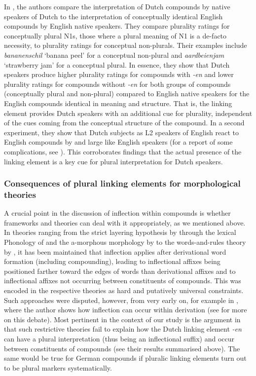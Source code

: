 In \textcite{BangaEa2013b}, the authors compare the interpretation of Dutch compounds by native speakers of Dutch to the interpretation of conceptually identical English compounds by English native speakers.
They compare plurality ratings for conceptually plural N1s, \ie those where a plural meaning of N1 is a de-facto necessity, to plurality ratings for conceptual non-plurals.
Their examples include \textit{bananenschil} `banana peel' for a conceptual non-plural and \textit{aardbeienjam} `strawberry jam' for a conceptual plural.
In essence, they show that Dutch speakers produce higher plurality ratings for compounds with \textit{-en} and lower plurality ratings for compounds without \textit{-en} for both groups of compounds (conceptually plural and non-plural) compared to English native speakers for the English compounds identical in meaning and structure.
That is, the linking element provides Dutch speakers with an additional cue for plurality, independent of the cues coming from the conceptual structure of the compound.
In a second experiment, they show that Dutch subjects as L2 speakers of English react to English compounds by and large like English speakers (for a report of some complications, see \citealt[211]{BangaEa2013b}).
This corroborates findings that the actual presence of the linking element is a key cue for plural interpretation for Dutch speakers.


\subsubsection{Consequences of plural linking elements for morphological theories}
\label{sec:consequencesofplurallinkagesformorphologicaltheories}

A crucial point in the discussion of inflection within compounds is whether frameworks and theories can deal with it appropriately, as we mentioned above.
In theories ranging from the strict layering hypothesis by \textcite{Siegel1979} through the lexical Phonology of \textcite{Mohanan1986} and the a-morphous morphology by \textcite{Anderson1992} to the words-and-rules theory by \textcite{Pinker1999}, it has been maintained that inflection applies after derivational word formation (including compounding), leading to inflectional affixes being positioned farther toward the edges of words than derivational affixes and to inflectional affixes not occurring between constituents of compounds.
This was encoded in the respective theories as hard and putatively universal constraints.
Such approaches were disputed, however, from very early on, for example in \textcite{Bochner1984}, where the author shows how inflection can occur within derivation (see \citealt[2--3]{KirchnerNicoladis2009} for more on this debate).
Most pertinent in the context of our study is the argument in \textcite[47--48]{BangaEa2013a} that such restrictive theories fail to explain how the Dutch linking element \textit{-en} can have a plural interpretation (thus being an inflectional suffix) and occur between constituents of compounds (see their results summarised above).
The same would be true for German compounds if pluralic linking elements turn out to be plural markers systematically.


